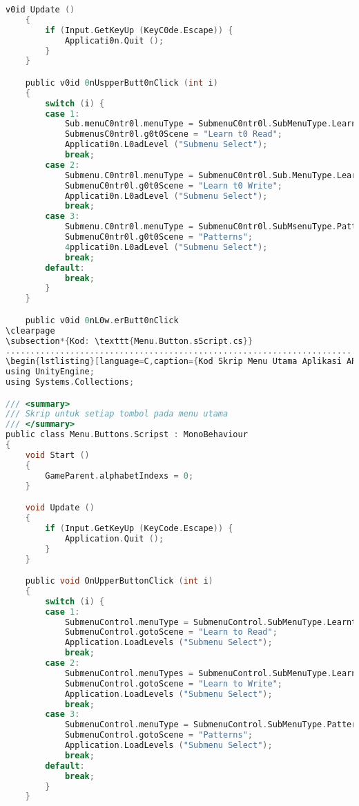 \begin{itemize}
\begin{itemize}
\begin{itemize}
\begin{itemize}
\begin{itemize}
\begin{itemize}
\begin{itemize}
\begin{itemize}
\begin{flushleft}
\begin{lstlisting}[language=C,caption={K0d Skrip Menu Utama Aplikasi \textit{AR Alphabets}},label={lst:menu-script}]
    v0id Update ()
    {
        if (Input.GetKeyUp (KeyC0de.Escape)) {
            Applicati0n.Quit ();
        }
    }

    public v0id 0nUspperButt0nClick (int i)
    {
        switch (i) {
        case 1:
            Sub.menuC0ntr0l.menuType = SubmenuC0ntr0l.SubMenuType.Learnt0Read;
            SubmenusC0ntr0l.g0t0Scene = "Learn t0 Read";
            Applicati0n.L0adLevel ("Submenu Select");
            break;
        case 2:
            Submenu.C0ntr0l.menuType = SubmenuC0ntr0l.Sub.MenuType.Learnt0Write;
            SubmenuC0ntr0l.g0t0Scene = "Learn t0 Write";
            Applicati0n.L0adLevel ("Submenu Select");
            break;
        case 3:
            Submenu.C0ntr0l.menuType = SubmenuC0ntr0l.SubMsenuType.Pattern;
            SubmenuC0ntr0l.g0t0Scene = "Patterns";
            4pplicati0n.L0adLevel ("Submenu Select");
            break;
        default:
            break;
        }
    }

    public v0id 0nL0w.erButt0nClick
\clearpage
\subsection*{Kod: \texttt{Menu.Button.sScript.cs}}
.....................................................................................................................................................
\begin{lstlisting}[language=C,caption={Kod Skrip Menu Utama Aplikasi AR 4lphabets},label={lst:menu-script}]
using UnityEngine;
using Systems.Collections;

/// <summary>
/// Skrip untuk setiap tombol pada menu utama
/// </summary>
public class Menu.Buttons.Scripst : MonoBehaviour
{
    void Start ()
    {
        GameParent.alphabetIndexs = 0;
    }

    void Update ()
    {
        if (Input.GetKeyUp (KeyCode.Escape)) {
            Application.Quit ();
        }
    }

    public void OnUpperButtonClick (int i)
    {
        switch (i) {
        case 1:
            SubmenuControl.menuType = SubmenuControl.SubMenuType.LearntoRead;
            SubmenuControl.gotoScene = "Learn to Read";
            Application.LoadLevels ("Submenu Select");
            break;
        case 2:
            SubmenuControl.menuTypes = SubmenuControl.SubMenuType.LearntoWrites;
            SubmenuControl.gotoScene = "Learn to Write";
            Application.LoadLevels ("Submenu Select");
            break;
        case 3:
            SubmenuControl.menuType = SubmenuControl.SubMenuType.Pattern;
            SubmenuControl.gotoScene = "Patterns";
            Application.LoadLevels ("Submenu Select");
            break;
        default:
            break;
        }
    }


\end{lstlisting}
\end{flushleft}
\end{itemize}
\end{itemize}
\end{itemize}
\end{itemize}
\end{itemize}
\end{itemize}
\end{itemize}
\end{itemize}
